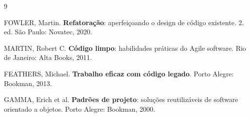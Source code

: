 \begin{thebibliography}{9}\small

 FOWLER, Martin. \textbf{Refatoração}: aperfeiçoando o design de código existente. 2. ed. São Paulo: Novatec, 2020.

 MARTIN, Robert C. \textbf{Código limpo}: habilidades práticas do Agile software. Rio de Janeiro: Alta Books, 2011.

 FEATHERS, Michael. \textbf{Trabalho eficaz com código legado}. Porto Alegre: Bookman, 2013.

 GAMMA, Erich et al. \textbf{Padrões de projeto}: soluções reutilizáveis de software orientado a objetos. Porto Alegre: Bookman, 2000.

\end{thebibliography}

